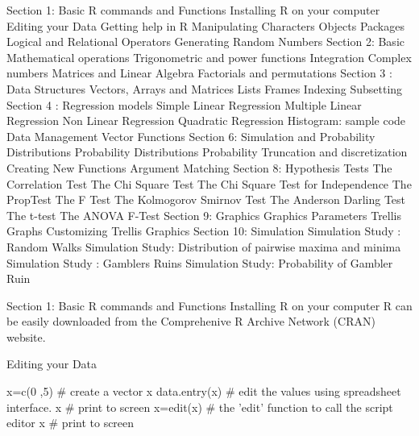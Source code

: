 \begin{frame}
\begin{frame}
\end{frame}
\begin{frame}

Section 1: Basic R commands and Functions
Installing R on your computer
Editing your Data
Getting help in R
Manipulating Characters
Objects
Packages
Logical and Relational Operators
Generating Random Numbers
Section 2: Basic Mathematical operations
Trigonometric and power functions
Integration
Complex numbers
Matrices and Linear Algebra
Factorials and permutations
Section 3 : Data Structures
Vectors, Arrays and Matrices
Lists
Frames
Indexing
Subsetting
Section 4 : Regression models
Simple Linear Regression
Multiple Linear Regression
Non Linear Regression
Quadratic Regression
Histogram: sample code
Data Management
Vector Functions
Section 6: Simulation and Probability Distributions
Probability Distributions
Probability
Truncation and discretization
Creating New Functions
Argument Matching
Section 8: Hypothesis Tests
The Correlation Test
The Chi Square Test
The Chi Square Test for Independence
The PropTest
The F Test
The Kolmogorov Smirnov Test
The Anderson Darling Test
The t-test
The ANOVA F-Test
Section 9: Graphics
Graphics Parameters
Trellis Graphs
Customizing Trellis Graphics
Section 10: Simulation
Simulation Study : Random Walks
Simulation Study: Distribution of pairwise maxima and minima
Simulation Study : Gamblers Ruins
Simulation Study: Probability of Gambler Ruin

\end{frame}
\begin{frame}

Section 1: Basic R commands and Functions
Installing R on your computer
R can be easily downloaded from the Comprehenive R Archive Network (CRAN) website.
\end{frame}
\begin{frame}

Editing your Data

x=c(0 ,5)     	      # create a vector x
data.entry(x)  	   # edit the values using spreadsheet interface.
x  	                     # print to screen
x=edit(x)	          # the 'edit' function to call the script editor
x  	                     # print to screen


\end{frame}
\end{frame}
